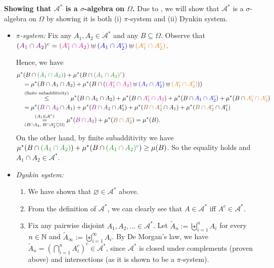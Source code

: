\begin{enumerate}
\begin{pf}
\textbf{Showing that \(\mathcal{A}^*\) is a \(\sigma\)-algebra on
\(\Omega\).} Due to , we will show that
\(\mathcal{A}^*\) is a \(\sigma\)-algebra on \(\Omega\) by showing it is
both (i) \(\pi\)-system and (ii) Dynkin system.

\begin{itemize}
\item \emph{\(\pi\)-system:} Fix any \(A_1,A_2\in\mathcal{A}^*\) and any
\(B\subseteq \Omega\).  Observe that \((\vc{A_1\cap A_2})^c =\mgc{(A_1^c\cap
A_2)}\uplus \blc{(A_1\cap A_2^c)}\uplus \orc{(A_1^c\cap A_2^c)} \).
\begin{center}
\end{center}
Hence, we have
\begin{align*}
&\mu^*(B\cap\gc{(A_1\cap A_2)})+\mu^*(B\cap\gc{(A_1\cap A_2)^{c}}) \\
&\quad=\mu^*(B\cap A_1\cap A_2)
+\mu^*(B\cap(\mgc{(A_1^c\cap A_2)}\uplus \blc{(A_1\cap A_2^c)}\uplus \orc{(A_1^c\cap A_2^c)})) \\
&\quad\overset{\text{(finite subadditivity)}}{\le}
\mu^*(B\cap A_1\cap A_2)
+\mu^*(B\cap\mgc{A_1^c\cap A_2})
+\mu^*(B\cap\blc{A_1\cap A_2^c})
+\mu^*(B\cap\orc{A_1^c\cap A_2^c}) \\
&\quad=\mu^*(\vc{B\cap A_2}\cap A_1)
+\mu^*(\vc{B\cap A_2}\cap A_1^c)
+\mu^*(\brc{B\cap A_2^c}\cap A_1)
+\mu^*(\brc{B\cap A_2^c}\cap A_1^c) \\
&\quad\underset{(B\cap A_2,\; B\cap A_2^c\subseteq \Omega)}{\overset{(A_1\in\mathcal{A}^*)}{=}}
\mu^*(\vc{B\cap A_2})+\mu^*(\brc{B\cap A_2^c})
=\mu^*(B).
\end{align*}
On the other hand, by finite subadditivity we have
\(\mu^*(B\cap\gc{(A_1\cap A_2)})+\mu^*(B\cap\gc{(A_1\cap A_2)^{c}})\ge
\mu(B)\).
So the equality holds and \(A_1\cap A_2\in\mathcal{A}^*\).
\item \emph{Dynkin system:}
\begin{enumerate}[label={(\arabic*)}]
\item We have shown that \(\varnothing\in\mathcal{A}^*\) above.
\item From the definition of \(\mathcal{A}^*\), we can clearly see that
\(A\in\mathcal{A}^*\) iff \(A^c\in\mathcal{A}^*\).
\item Fix any pairwise disjoint \(A_1,A_2,\dotsc\in\mathcal{A}^*\). Let
\(\widetilde{A}_n:=\biguplus_{i=1}^{n}A_i\) for every \(n\in\mathbb{N}\) and
\(\widetilde{A}_{\infty}:=\biguplus_{i=1}^{\infty}A_i\). By De Morgan's law, we
have \(\widetilde{A}_n=(\bigcap_{i=1}^{n}A_i^c)^{c}\in\mathcal{A}^*\), since
\(\mathcal{A}^*\) is closed under complements (proven above) and intersections
(as it is shown to be a \(\pi\)-system).


\end{enumerate}
\end{itemize}
\end{pf}
\end{enumerate}
